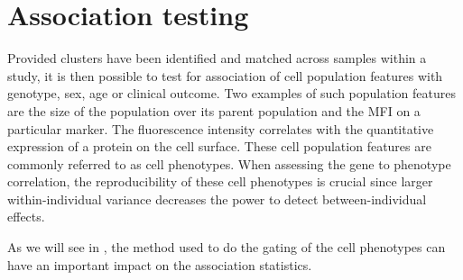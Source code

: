 \section{Association testing}

Provided clusters have been identified and matched across samples within a study, it is then possible to test for association of cell population
features with genotype, sex, age or clinical outcome.
Two examples of such population features are the size of the population over its parent population and the \gls{MFI} on a particular marker.
The fluorescence intensity correlates with the quantitative expression of a protein on the cell surface.
These cell population features are commonly referred to as cell phenotypes.  
When assessing the gene to phenotype correlation, the reproducibility of these cell phenotypes is crucial since
larger within-individual variance decreases the power to detect between-individual effects.

As we will see in , the method used to do the gating of the cell phenotypes can have an important impact on the association
statistics.

%
%
%
%
%


